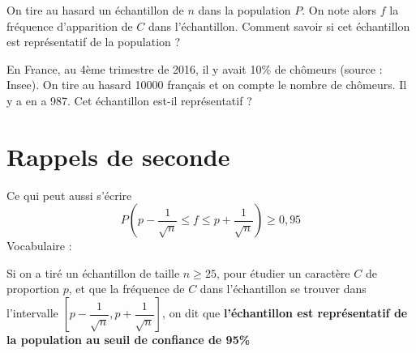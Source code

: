 On tire au hasard un échantillon de $n$ dans la population $P$. On note alors $f$ la fréquence d'apparition de $C$ dans l'échantillon. Comment savoir si cet échantillon est représentatif de la population ? \newline 

\begin{exemple}
En France, au 4ème trimestre de 2016, il y avait 10\% de chômeurs (source : Insee). On tire au hasard 10000 français et on compte le nombre de chômeurs. Il y a en a 987. Cet échantillon est-il représentatif ?
\end{exemple}
\section{Rappels de seconde}
\newline

Ce qui peut aussi s'écrire 
$$P\left(p - \dfrac{1}{\sqrt{n}} \leq f \leq p + \dfrac{1}{\sqrt{n}}\right) \geq 0,95$$
Vocabulaire : \newline

Si on a tiré un échantillon de taille $n \geq 25$, pour étudier un caractère $C$ de proportion $p$, et que la fréquence de $C$ dans l'échantillon se trouver dans l'intervalle $\left[p - \dfrac{1}{\sqrt{n}},p + \dfrac{1}{\sqrt{n}}\right]$, on dit que \textbf{l'échantillon est représentatif de la population au seuil de confiance de 95\%}\newline

